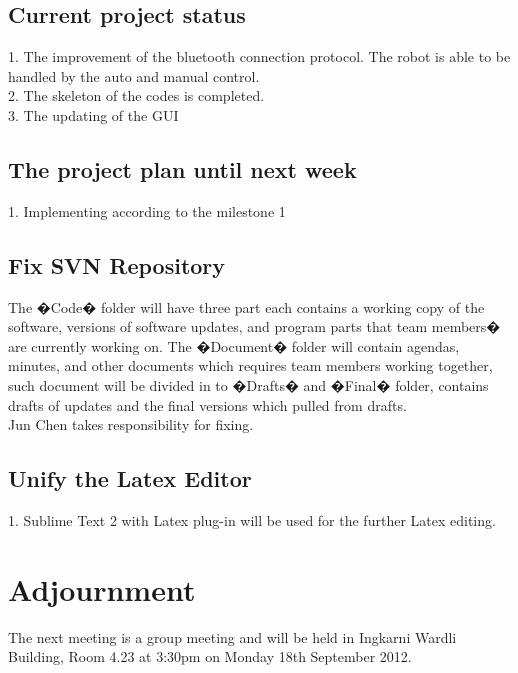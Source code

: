\documentclass[11pt, a4paper]{article}
\begin{document}
\subsection{Current project status}
1. The improvement of the bluetooth connection protocol. The robot is able to be handled by the auto and manual control.\\
2. The skeleton of the codes is completed.\\
3. The updating of the GUI\\

\subsection{The project plan until next week}
1. Implementing according to the milestone 1\\ 

\subsection{Fix SVN Repository}
 The �Code� folder will have three part each contains a working copy of the software, versions of software updates, and program parts that team members� are currently working on. The �Document�
folder will contain agendas, minutes, and other documents which requires team members working
together, such document will be divided in to �Drafts� and �Final� folder, contains drafts of
updates and the final versions which pulled from drafts.\\
Jun Chen takes responsibility for fixing.\\

\subsection{ Unify the Latex Editor}
1. Sublime Text 2 with Latex plug-in will be used for the further Latex editing.\\ 


\section{Adjournment}
The next meeting is a group meeting and will be held in Ingkarni Wardli Building, Room 4.23 at 3:30pm on Monday 18th September 2012.

\vspace*{10pt}
\end{document}
